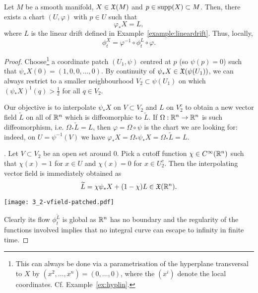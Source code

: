 \begin{theorem}
	Let $M$ be a smooth manifold, $X\in\mathfrak{X}(M)$ and $p\in\operatorname{supp}(X)\subset M$.
	Then, there exists a chart $(U, \varphi)$ with $p\in U$ such that
	\begin{equation}
		\varphi_* X = L,
	\end{equation}
	where $L$ is the linear drift defined in Example~\ref{example:lineardrift}.
	Thus, locally,
	\begin{equation}
		\phi_t^X = \varphi^{-1} \circ \phi_t^L \circ \varphi.
	\end{equation}
\end{theorem}
\begin{proof}
	Choose\footnote{This can always be done via a parametrisation of the hyperplane transversal to $X$ by $(x^2, \ldots, x^{n}) = (0,\ldots,0)$, where the $(x^i)$ denote the local coordinates. Cf. Example~\ref{ex:hyplin}.} a coordinate patch $(U_1, \psi)$ centred at $p$ (so $\psi(p) = 0$) such that $\psi_* X(0) = (1,0,0,\ldots, 0)$.
	By continuity of $\psi_*X\in \mathfrak{X}(\psi(U_1))$, we can always restrict to a smaller neighbourhood $V_2\subset \psi(U_1)$ on which $(\psi_*X)^1(q) > \frac12$ for all $q\in V_2$.

	Our objective is to interpolate $\psi_* X$ on $V\subset V_2$ and $L$ on $V_2^c$ to obtain a new vector field $\widetilde{L}$ on all of $\mathbb{R}^n$ which is diffeomorphic to $\widetilde{L}$.
	If $\Omega:\mathbb{R}^n\to\mathbb{R}^n$ is such diffeomorphism, i.e. $\Omega_* \widetilde  L = L$, then $\varphi = \Omega\circ\psi$ is the chart we are looking for: indeed, on $U=\psi^{-1}(V)$ we have $\varphi_* X = \Omega_*\psi_*X = \Omega_* \widetilde{L} = L$.

	. Let $V\subset V_2$ be an open set around $0$. Pick a cutoff function $\chi\in C^\infty(\mathbb{R}^n)$ such that $\chi(x) = 1$ for $x\in U$ and $\chi(x) =0$ for $x\in U_2^c$.
	Then the interpolating vector field is immediately obtained as
	\begin{equation}
		\widetilde{L} = \chi \psi_*X + (1-\chi)L \in \mathfrak{X}(\mathbb{R}^n).
	\end{equation}
	\begin{marginfigure}
		\texttt{[image: 3\_2-vfield-patched.pdf]}
	\end{marginfigure}
	Clearly its flow $\phi_t^{\widetilde{L}}$ is global as $\mathbb{R}^n$ has no boundary and the regularity of the functions involved implies that no integral curve can escape to infinity in finite time.


\end{proof}
